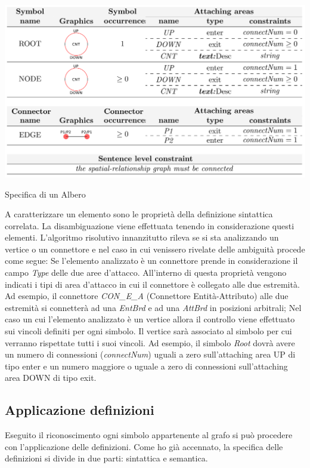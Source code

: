            \begin{table}[htbp]
                \centering
                \includegraphics[scale=0.4]{Figure/final_syntax_definition_tree.PNG}
                \caption{Specifica di un Albero}
                \label{tab:final_syntax_definition_tree}
            \end{table}

            A caratterizzare un elemento sono le proprietà della definizione sintattica correlata. La disambiguazione viene effettuata tenendo in considerazione questi elementi.
            \newline
            L'algoritmo risolutivo innanzitutto rileva se si sta analizzando un vertice o un connettore e nel caso in cui venissero rivelate delle ambiguità procede come segue: Se l'elemento analizzato è un connettore prende in considerazione il campo \textit{Type} delle due aree d'attacco. All'interno di questa proprietà vengono indicati i tipi di area d'attacco in cui il connettore è collegato alle due estremità. Ad esempio, il connettore \textit{CON\_E\_A} (Connettore Entità-Attributo) alle due estremità si connetterà ad una \textit{EntBrd} e ad una \textit{AttBrd} in posizioni arbitrali; Nel caso un cui l'elemento analizzato è un vertice allora il controllo viene effettuato sui vincoli definiti per ogni simbolo. Il vertice sarà associato al simbolo per cui verranno rispettate tutti i suoi vincoli. Ad esempio, il simbolo \textit{Root} dovrà avere un numero di connessioni (\textit{connectNum}) uguali a zero sull'attaching area UP di tipo enter e un numero maggiore o uguale a zero di connessioni sull'attaching area DOWN di tipo exit.
            \newline

        \subsection{Applicazione definizioni}
            Eseguito il riconoscimento ogni simbolo appartenente al grafo si può procedere con l'applicazione delle definizioni. Come ho già accennato, la specifica delle definizioni si divide in due parti: sintattica e semantica.

